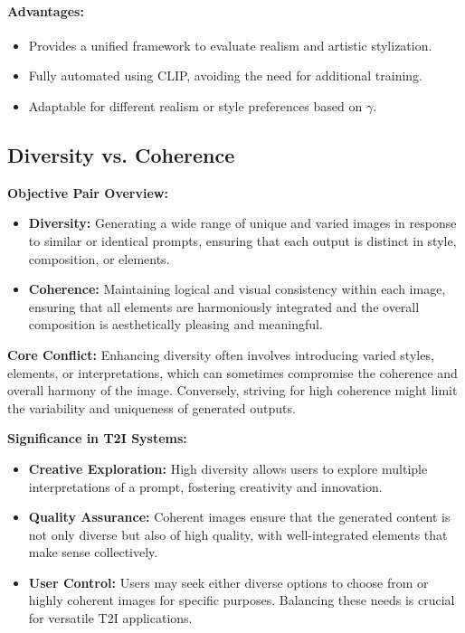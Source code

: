 \paragraph{Advantages:}
\begin{itemize}
    \item Provides a unified framework to evaluate realism and artistic stylization.
    \item Fully automated using CLIP, avoiding the need for additional training.
    \item Adaptable for different realism or style preferences based on \(\gamma\).
\end{itemize}


\subsection{Diversity vs. Coherence}

\textbf{Objective Pair Overview:}
\begin{itemize}
    \item \textbf{Diversity:} Generating a wide range of unique and varied images in response to similar or identical prompts, ensuring that each output is distinct in style, composition, or elements.
    \item \textbf{Coherence:} Maintaining logical and visual consistency within each image, ensuring that all elements are harmoniously integrated and the overall composition is aesthetically pleasing and meaningful.
\end{itemize}

\textbf{Core Conflict:}
Enhancing diversity often involves introducing varied styles, elements, or interpretations, which can sometimes compromise the coherence and overall harmony of the image. Conversely, striving for high coherence might limit the variability and uniqueness of generated outputs.

\textbf{Significance in T2I Systems:}
\begin{itemize}
    \item \textbf{Creative Exploration:} High diversity allows users to explore multiple interpretations of a prompt, fostering creativity and innovation.
    \item \textbf{Quality Assurance:} Coherent images ensure that the generated content is not only diverse but also of high quality, with well-integrated elements that make sense collectively.
    \item \textbf{User Control:} Users may seek either diverse options to choose from or highly coherent images for specific purposes. Balancing these needs is crucial for versatile T2I applications.
\end{itemize}

